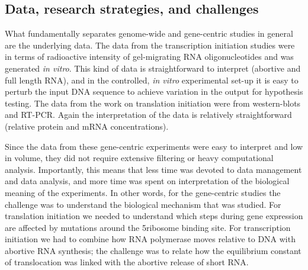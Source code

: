 \subsection{Data, research strategies, and challenges}
What fundamentally separates genome-wide and gene-centric studies in general
are the underlying data. The data from the transcription initiation studies
were in terms of radioactive intensity of gel-migrating RNA oligonucleotides
and was generated \textit{in vitro}. This kind of data is straightforward to
interpret (abortive and full length RNA), and in the controlled, \textit{in
vitro} experimental set-up it is easy to perturb the input DNA sequence to
achieve variation in the output for hypothesis testing. The data from the work
on translation initiation were from western-blots and RT-PCR. Again the
interpretation of the data is relatively straightforward (relative protein and
mRNA concentrations).

Since the data from these gene-centric experiments were easy to interpret and
low in volume, they did not require extensive filtering or heavy computational
analysis. Importantly, this means that less time was devoted to data management
and data analysis, and more time was spent on interpretation of the biological
meaning of the experiments. In other words, for the gene-centric studies the
challenge was to understand the biological mechanism that was studied. For
translation initiation we needed to understand which steps during gene
expression are affected by mutations around the 5\ppp ribosome binding site.
For transcription initiation we had to combine how RNA polymerase moves
relative to DNA with abortive RNA synthesis; the challenge was to relate how
the equilibrium constant of translocation was linked with the abortive release
of short RNA.

